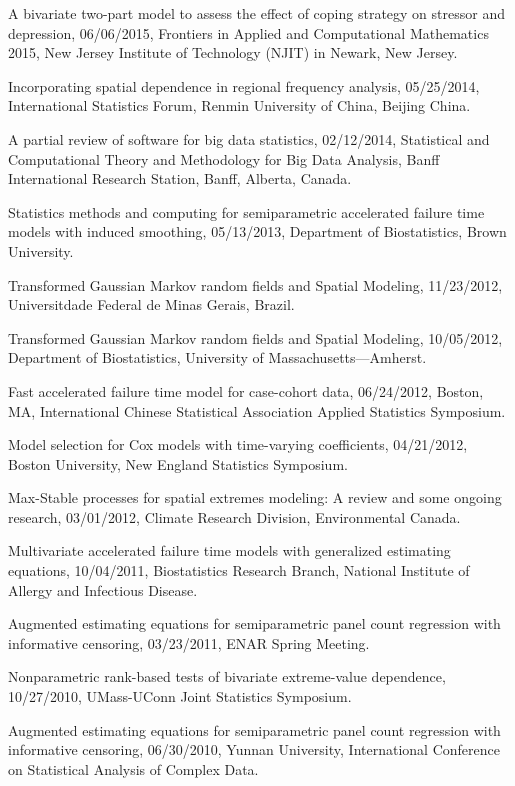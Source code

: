 \documentclass[Statistics]{vita}
\begin{document}
\begin{vita}
\begin{InvitedTalksLectures}
\begin{InvitedTalks}
  \item A bivariate two-part model to assess the effect of coping strategy on stressor and depression, 06/06/2015, Frontiers in Applied and Computational Mathematics 2015, New Jersey Institute of Technology (NJIT) in Newark, New Jersey.
  \item Incorporating spatial dependence in regional frequency analysis, 05/25/2014, International Statistics Forum, Renmin University of China, Beijing China.
  \item A partial review of software for big data statistics, 02/12/2014, Statistical and Computational Theory and Methodology for Big Data Analysis, Banff International Research Station, Banff, Alberta, Canada.
  \item Statistics methods and computing for semiparametric accelerated failure time models with induced smoothing, 05/13/2013, Department of Biostatistics, Brown University.
  \item Transformed Gaussian Markov random fields and Spatial Modeling, 11/23/2012, Universitdade Federal de Minas Gerais, Brazil.
  \item Transformed Gaussian Markov random fields and Spatial Modeling, 10/05/2012, Department of Biostatistics, University of Massachusetts---Amherst.
  \item Fast accelerated failure time model for case-cohort data, 06/24/2012, Boston, MA, International Chinese Statistical Association Applied Statistics Symposium.
  \item Model selection for Cox models with time-varying coefficients, 04/21/2012, Boston University, New England Statistics Symposium.
  \item Max-Stable processes for spatial extremes modeling: A review and some ongoing research, 03/01/2012, Climate Research Division, Environmental Canada.
  \item Multivariate accelerated failure time models with generalized estimating equations, 10/04/2011, Biostatistics Research Branch, National Institute of Allergy and Infectious Disease.
  \item Augmented estimating equations for semiparametric panel count regression with informative censoring, 03/23/2011, ENAR Spring Meeting.
  \item Nonparametric rank-based tests of bivariate extreme-value dependence, 10/27/2010, UMass-UConn Joint Statistics Symposium.
  \item Augmented estimating equations for semiparametric panel count regression with informative censoring, 06/30/2010, Yunnan University, International Conference on Statistical Analysis of Complex Data.

\end{InvitedTalks}
\end{InvitedTalksLectures}
\end{vita}
\end{document}
